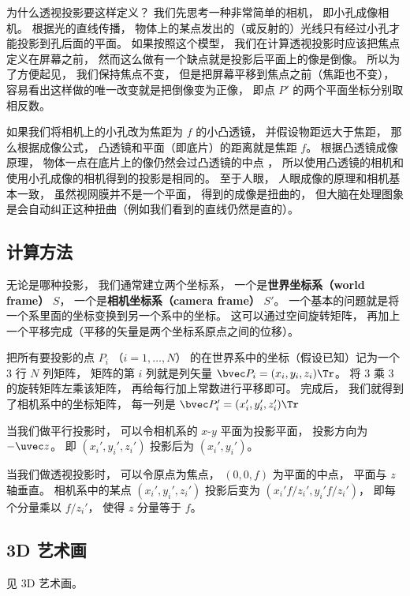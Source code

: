 为什么透视投影要这样定义？ 我们先思考一种非常简单的相机， 即小孔成像相机。 根据光的直线传播， 物体上的某点发出的（或反射的）光线只有经过小孔才能投影到孔后面的平面。 如果按照这个模型， 我们在计算透视投影时应该把焦点定义在屏幕之前， 然而这么做有一个缺点就是投影后平面上的像是倒像。 所以为了方便起见， 我们保持焦点不变， 但是把屏幕平移到焦点之前（焦距也不变）， 容易看出这样做的唯一改变就是把倒像变为正像， 即点 $P'$ 的两个平面坐标分别取相反数。 %

如果我们将相机上的小孔改为焦距为 $f$ 的小凸透镜， 并假设物距远大于焦距， 那么根据成像公式， 凸透镜和平面（即底片）的距离就是焦距 $f$。 根据凸透镜成像原理， 物体一点在底片上的像仍然会过凸透镜的中点%
， 所以使用凸透镜的相机和使用小孔成像的相机得到的投影是相同的。 至于人眼， 人眼成像的原理和相机基本一致， 虽然视网膜并不是一个平面， 得到的成像是扭曲的， 但大脑在处理图象是会自动纠正这种扭曲（例如我们看到的直线仍然是直的）。

\subsection{计算方法}
无论是哪种投影， 我们通常建立两个坐标系， 一个是\textbf{世界坐标系（world frame）} $S$， 一个是\textbf{相机坐标系}\textbf{（camera frame）} $S'$。 一个基本的问题就是将一个系里面的坐标变换到另一个系中的坐标。 这可以通过空间旋转矩阵， 再加上一个平移完成（平移的矢量是两个坐标系原点之间的位移）。

把所有要投影的点 $P_i$ （$i = 1, \dots, N$） 的在世界系中的坐标（假设已知）记为一个 3 行 $N$ 列矩阵， 矩阵的第 $i$ 列就是列矢量 $\bvec P_i = (x_i, y_i, z_i)\Tr$。 将 3 乘 3 的旋转矩阵左乘该矩阵， 再给每行加上常数进行平移即可。 完成后， 我们就得到了相机系中的坐标矩阵， 每一列是 $\bvec P_i' = (x_i', y_i', z_i')\Tr$

当我们做平行投影时， 可以令相机系的 $x$-$y$ 平面为投影平面， 投影方向为 $-\uvec z$。 即 $(x_i', y_i', z_i')$ 投影后为 $(x_i', y_i')$。

当我们做透视投影时， 可以令原点为焦点， $(0, 0, f)$ 为平面的中点， 平面与 $z$ 轴垂直。 相机系中的某点 $(x_i', y_i', z_i')$ 投影后变为 $(x_i' f/z_i', y_i' f/z_i')$， 即每个分量乘以 $f/z_i'$， 使得 $z$ 分量等于 $f$。


\subsection{3D 艺术画}
见 3D 艺术画。
